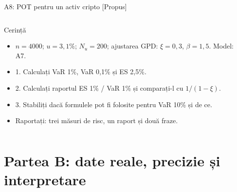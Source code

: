 \begin{frame}{A8: POT pentru un activ cripto [Propus]}
\propsub
\itemsize{\scriptsize}
\begin{columns}[T]
\begin{column}{\taskw}
\begin{block}{Cerință}
\begin{itemize}
    \item $n = 4000$; $u = 3{,}1\%$; $N_u = 200$; ajustarea GPD: $\xi = 0{,}3$, $\beta = 1{,}5$. Model: A7.
    \item 1. Calculați VaR 1\%, VaR 0,1\% și ES 2,5\%.
    \item 2. Calculați raportul ES 1\% / VaR 1\% și comparați-l cu $1/(1 - \xi)$.
    \item 3. Stabiliți dacă formulele pot fi folosite pentru VaR 10\% și de ce.
    \item Raportați: trei măsuri de risc, un raport și două fraze.
\end{itemize}
\end{block}
\end{column}
\begin{column}{\solw}
\end{column}
\end{columns}
\end{frame}


\section{Partea B: date reale, precizie și interpretare}

